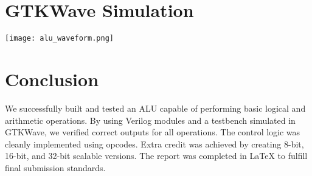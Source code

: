 \documentclass{article}
\begin{document}
\section*{GTKWave Simulation}
\begin{center}
\texttt{[image: alu\_waveform.png]}
\end{center}

\section*{Conclusion}
We successfully built and tested an ALU capable of performing basic logical and arithmetic operations. By using Verilog modules and a testbench simulated in GTKWave, we verified correct outputs for all operations. The control logic was cleanly implemented using opcodes. Extra credit was achieved by creating 8-bit, 16-bit, and 32-bit scalable versions. The report was completed in LaTeX to fulfill final submission standards.
\end{document}
